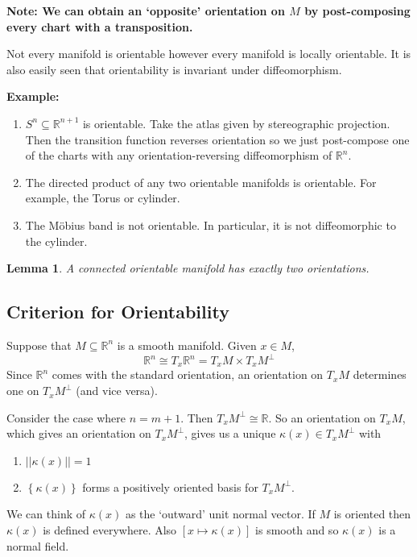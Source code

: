 \documentclass[11pt]{article}
\newcommand{\norm}[1]{||#1||}
\newcommand{\R}{\mathbb{R}}
\newenvironment{note}
	{\begin{mdframed}[backgroundcolor=white, linecolor=RubineRed, roundcorner=5pt, linewidth=1pt]\bfseries{Note:}\normalfont
	\setlength{\parindent}{0pt}}
	{\end{mdframed}}
\newenvironment{eg}
	{\begin{mdframed}[backgroundcolor=mylg,roundcorner=5pt,linewidth=0pt]\bfseries{Example:}\normalfont
	\setlength{\parindent}{0pt}}
	{\end{mdframed}}
\newtheorem{lemma}[theorem]{Lemma}
\begin{document}
\begin{note}
We can obtain an `opposite' orientation on $M$ by post-composing every chart with a transposition.
\end{note}

Not every manifold is orientable however every manifold is locally orientable.
It is also easily seen that orientability is invariant under diffeomorphism.

\begin{eg}
	\begin{enumerate}
		\item $S^n \subseteq \R^{n+1}$ is orientable.
			Take the atlas given by stereographic projection.
			Then the transition function reverses orientation so we just post-compose one of the charts with any orientation-reversing diffeomorphism of $\R^n$.
		\item The directed product of any two orientable manifolds is orientable.
			For example, the Torus or cylinder.
		\item The M\"obius band is not orientable.
			In particular, it is not diffeomorphic to the cylinder.
	\end{enumerate}
\end{eg}

\begin{lemma}
A connected orientable manifold has exactly two orientations.
\end{lemma}

\subsection{Criterion for Orientability}
Suppose that $M\subseteq \R^n$ is a smooth manifold.
Given $x\in M$, 
\[
\R^n\cong T_x\R^n = T_xM \times T_xM^\perp
\]
Since $\R^n$ comes with the standard orientation, an orientation on $T_xM$ determines one on $T_xM^\perp$ (and vice versa).

Consider the case where $n=m+1$.
Then $T_xM^\perp\cong \R$.
So an orientation on $T_xM$, which gives an orientation on $T_xM^\perp$, gives us a unique $\kappa(x)\in T_xM^\perp$ with 
\begin{enumerate}
	\item $\norm{\kappa(x)}=1$
	\item $\left\{ \kappa(x)\right\}$ forms a positively oriented basis for $T_xM^\perp$.
\end{enumerate}

We can think of $\kappa(x)$ as the `outward' unit normal vector.
If $M$ is oriented then $\kappa(x)$ is defined everywhere.
Also $[x\mapsto \kappa(x)]$ is smooth and so $\kappa(x)$ is a normal field.
\end{document}
